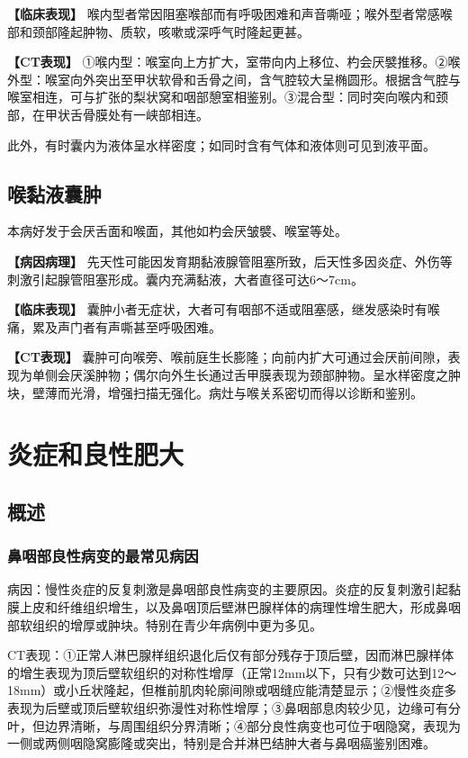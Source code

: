 \textbf{【临床表现】}
喉内型者常因阻塞喉部而有呼吸困难和声音嘶哑；喉外型者常感喉部和颈部隆起肿物、质软，咳嗽或深呼气时隆起更甚。

\textbf{【CT表现】}
①喉内型：喉室向上方扩大，室带向内上移位、杓会厌襞推移。②喉外型：喉室向外突出至甲状软骨和舌骨之间，含气腔较大呈椭圆形。根据含气腔与喉室相连，可与扩张的梨状窝和咽部憩室相鉴别。③混合型：同时突向喉内和颈部，在甲状舌骨膜处有一峡部相连。

此外，有时囊内为液体呈水样密度；如同时含有气体和液体则可见到液平面。

\subsection{喉黏液囊肿}

本病好发于会厌舌面和喉面，其他如杓会厌皱襞、喉室等处。

\textbf{【病因病理】}
先天性可能因发育期黏液腺管阻塞所致，后天性多因炎症、外伤等刺激引起腺管阻塞形成。囊内充满黏液，大者直径可达6～7cm。

\textbf{【临床表现】}
囊肿小者无症状，大者可有咽部不适或阻塞感，继发感染时有喉痛，累及声门者有声嘶甚至呼吸困难。

\textbf{【CT表现】}
囊肿可向喉旁、喉前庭生长膨隆；向前内扩大可通过会厌前间隙，表现为单侧会厌溪肿物；偶尔向外生长通过舌甲膜表现为颈部肿物。呈水样密度之肿块，壁薄而光滑，增强扫描无强化。病灶与喉关系密切而得以诊断和鉴别。

\section{炎症和良性肥大}

\subsection{概述}

\subsubsection{鼻咽部良性病变的最常见病因}

病因：慢性炎症的反复刺激是鼻咽部良性病变的主要原因。炎症的反复刺激引起黏膜上皮和纤维组织增生，以及鼻咽顶后壁淋巴腺样体的病理性增生肥大，形成鼻咽部软组织的增厚或肿块。特别在青少年病例中更为多见。

CT表现：①正常人淋巴腺样组织退化后仅有部分残存于顶后壁，因而淋巴腺样体的增生表现为顶后壁软组织的对称性增厚（正常12mm以下，只有少数可达到12～18mm）或小丘状隆起，但椎前肌肉轮廓间隙或咽缝应能清楚显示；②慢性炎症多表现为后壁或顶后壁软组织弥漫性对称性增厚；③鼻咽部息肉较少见，边缘可有分叶，但边界清晰，与周围组织分界清晰；④部分良性病变也可位于咽隐窝，表现为一侧或两侧咽隐窝膨隆或突出，特别是合并淋巴结肿大者与鼻咽癌鉴别困难。

